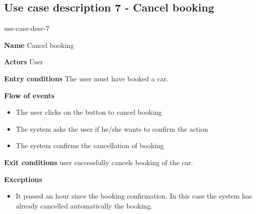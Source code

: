 \subsection{Use case description 7 - Cancel booking}
\begin{labeling}{use-case-desc-7}
		\item[\textbf{Name}] Cancel booking
		\item[\textbf{Actors}] User
		\item[\textbf{Entry conditions}] The user must have booked a car.
		\item[\textbf{Flow of events}]
			\begin{itemize}
				\item[]
				\item The user clicks on the button to cancel booking
				\item The system asks the user if he/she wants to confirm the action
				\item The system confirms the cancellation of booking
			\end{itemize}
		\item[\textbf{Exit conditions}] user successfully cancels booking of the car.
		\item[\textbf{Exceptions}]
			\begin{itemize}
				\item[]
				\item It passed an hour since the booking confirmation. In this case the system has already cancelled automatically the booking. 
			\end{itemize}
	\end{labeling}